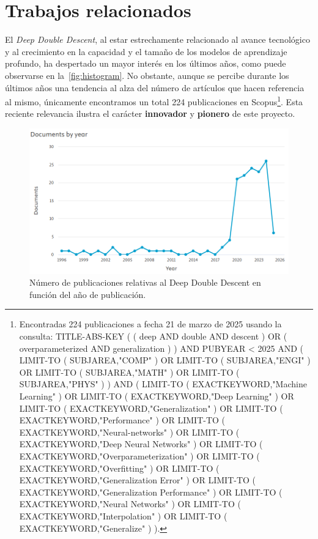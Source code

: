 
\chapter{Trabajos relacionados}\label{sec:evolucion-ddd}

El \emph{Deep Double Descent}, al estar estrechamente relacionado al avance tecnológico y al crecimiento en la capacidad y el tamaño de los modelos de aprendizaje profundo, ha despertado un mayor interés en los últimos años, como puede observarse en la~\autoref{fig:histogram}. No obstante, aunque se percibe durante los últimos años una tendencia al alza del número de artículos que hacen referencia al mismo, únicamente encontramos un total 224 publicaciones en Scopus\footnote{Encontradas 224 publicaciones a fecha 21 de marzo de 2025 usando la consulta: TITLE-ABS-KEY ( ( deep AND double AND descent ) OR ( overparameterized AND generalization ) ) AND PUBYEAR < 2025 AND ( LIMIT-TO ( SUBJAREA,"COMP" ) OR LIMIT-TO ( SUBJAREA,"ENGI" ) OR LIMIT-TO ( SUBJAREA,"MATH" ) OR LIMIT-TO ( SUBJAREA,"PHYS" ) ) AND ( LIMIT-TO ( EXACTKEYWORD,"Machine Learning" ) OR LIMIT-TO ( EXACTKEYWORD,"Deep Learning" ) OR LIMIT-TO ( EXACTKEYWORD,"Generalization" ) OR LIMIT-TO ( EXACTKEYWORD,"Performance" ) OR LIMIT-TO ( EXACTKEYWORD,"Neural-networks" ) OR LIMIT-TO ( EXACTKEYWORD,"Deep Neural Networks" ) OR LIMIT-TO ( EXACTKEYWORD,"Overparameterization" ) OR LIMIT-TO ( EXACTKEYWORD,"Overfitting" ) OR LIMIT-TO ( EXACTKEYWORD,"Generalization Error" ) OR LIMIT-TO ( EXACTKEYWORD,"Generalization Performance" ) OR LIMIT-TO ( EXACTKEYWORD,"Neural Networks" ) OR LIMIT-TO ( EXACTKEYWORD,"Interpolation" ) OR LIMIT-TO ( EXACTKEYWORD,"Generalize" ) ).}. Esta reciente relevancia ilustra el carácter \textbf{innovador} y \textbf{pionero} de este proyecto.\newline

\begin{figure}[h]
    \centering
    \includegraphics[width=0.8\linewidth]{img/scopus_histogram.png}
    \caption[Número de publicaciones relativas al Deep Double Descent (ir actualizando histograma de cara a nuevos papers).] {Número de publicaciones relativas al Deep Double Descent en función del año de publicación.}\label{fig:histogram}
\end{figure}

